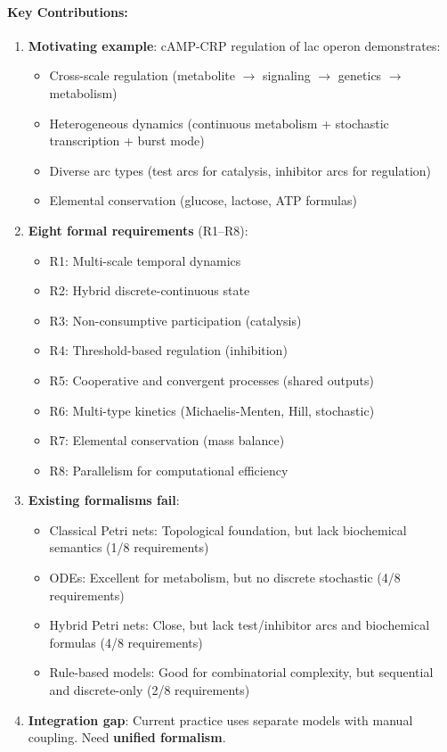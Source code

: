 \paragraph{Key Contributions:}
\begin{enumerate}
    \item \textbf{Motivating example}: cAMP-CRP regulation of lac operon demonstrates:
    \begin{itemize}
        \item Cross-scale regulation (metabolite $\to$ signaling $\to$ genetics $\to$ metabolism)
        \item Heterogeneous dynamics (continuous metabolism + stochastic transcription + burst mode)
        \item Diverse arc types (test arcs for catalysis, inhibitor arcs for regulation)
        \item Elemental conservation (glucose, lactose, ATP formulas)
    \end{itemize}
    
    \item \textbf{Eight formal requirements} (R1--R8):
    \begin{itemize}
        \item R1: Multi-scale temporal dynamics
        \item R2: Hybrid discrete-continuous state
        \item R3: Non-consumptive participation (catalysis)
        \item R4: Threshold-based regulation (inhibition)
        \item R5: Cooperative and convergent processes (shared outputs)
        \item R6: Multi-type kinetics (Michaelis-Menten, Hill, stochastic)
        \item R7: Elemental conservation (mass balance)
        \item R8: Parallelism for computational efficiency
    \end{itemize}
    
    \item \textbf{Existing formalisms fail}:
    \begin{itemize}
        \item Classical Petri nets: Topological foundation, but lack biochemical semantics (1/8 requirements)
        \item ODEs: Excellent for metabolism, but no discrete stochastic (4/8 requirements)
        \item Hybrid Petri nets: Close, but lack test/inhibitor arcs and biochemical formulas (4/8 requirements)
        \item Rule-based models: Good for combinatorial complexity, but sequential and discrete-only (2/8 requirements)
    \end{itemize}
    
    \item \textbf{Integration gap}: Current practice uses separate models with manual coupling. Need \textbf{unified formalism}.
\end{enumerate}

